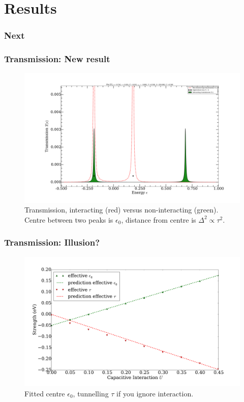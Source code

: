 \section{Results}
\begin{frame}
    \frametitle{Next}
\end{frame}
\begin{frame}
    \frametitle{Transmission: New result}
    \vspace{-3mm}
    \begin{figure}[!b] 
        \centering
        \includegraphics[height=.70\textheight]{res/perrin_two_site.pdf}
        \vspace{-6mm}
        \caption{Transmission, interacting (red) versus non-interacting (green). Centre between two peaks is $\epsilon_0$, distance from centre is $\Delta^2 \propto \tau^2$. }
    \end{figure} 
\end{frame}
\begin{frame}
    \frametitle{Transmission: Illusion?}
    \begin{figure}[!b] 
        \centering
        \includegraphics[height=.70\textheight]{res/perrin_effective.pdf}
        \caption{Fitted centre $\epsilon_0$, tunnelling $\tau$ if you ignore interaction.}
    \end{figure} 
\end{frame}
